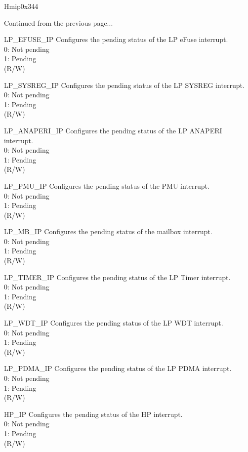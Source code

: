 \begin{register}{H}{mip}{0x344}
\begin{regdesc}\begin{reglist}
\item [Continued from the previous page...]
\label{fielddesc:LPMIPEFUSEIP}\item [LP\_EFUSE\_IP] Configures the pending status of the LP eFuse interrupt.\\
0: Not pending\\
1: Pending \\(R/W)
\label{fielddesc:LPMIPSYSREGIP}\item [LP\_SYSREG\_IP] Configures the pending status of the LP SYSREG interrupt.\\
0: Not pending\\
1: Pending \\(R/W)
\label{fielddesc:LPMIPANAPERIIP}\item [LP\_ANAPERI\_IP] Configures the pending status of the LP ANAPERI interrupt.\\
0: Not pending\\
1: Pending \\(R/W)
\label{fielddesc:LPMIPPMUIP}\item [LP\_PMU\_IP] Configures the pending status of the PMU interrupt.\\
0: Not pending\\
1: Pending \\(R/W)
\label{fielddesc:LPMIPMBIP}\item [LP\_MB\_IP] Configures the pending status of the mailbox interrupt.\\
0: Not pending\\
1: Pending \\(R/W)
\label{fielddesc:LPMIPTIMERIP}\item [LP\_TIMER\_IP] Configures the pending status of the LP Timer interrupt.\\
0: Not pending\\
1: Pending \\(R/W)
\label{fielddesc:LPMIPWDTIP}\item [LP\_WDT\_IP] Configures the pending status of the LP WDT interrupt.\\
0: Not pending\\
1: Pending \\(R/W)
\label{fielddesc:LPMIPPDMAIP}\item [LP\_PDMA\_IP] Configures the pending status of the LP PDMA interrupt.\\
0: Not pending\\
1: Pending \\(R/W)
\label{fielddesc:LPMIPHPIP}\item [HP\_IP] Configures the pending status of the HP interrupt.\\
0: Not pending\\
1: Pending \\(R/W)
\end{reglist}\end{regdesc}
\end{register}

